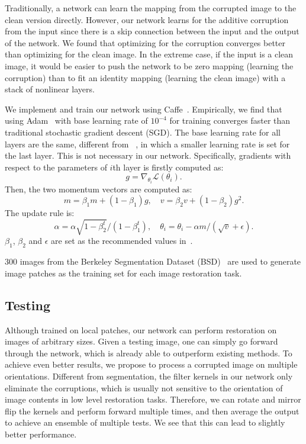 Traditionally, a  network can learn the mapping from the corrupted image to the clean version
directly. However, our network learns for the additive corruption from the input since there
is a skip connection between the input and the output of the network.
%
%
%
We found that optimizing for the corruption converges better than
optimizing for the clean image. In the extreme case, if the input is a clean image, it would be easier
to push the network to be zero mapping (learning the corruption) than to fit an identity
mapping (learning the clean image) with a stack of nonlinear layers.

We implement and train our network using Caffe~\cite{jia2014caffe}. Empirically, we find
that using Adam~\cite{DBLP:journals/corr/KingmaB14} with base learning rate of $10^{-4}$ for
training converges faster than traditional stochastic gradient descent (SGD). The base
learning rate for all layers are the same, different from ~\cite{DBLP:journals/pami/DongLHT16,
DBLP:conf/nips/JainS08}, in which a smaller learning rate is set for the last layer.
This  is not necessary in our network. Specifically, gradients with respect to the
parameters of $i$th layer is firstly computed as:
\begin{equation}
g = \nabla_{\theta_i}\mathcal{L}(\theta_i).
\end{equation}
Then, the two momentum vectors are computed as:
\begin{equation}
m = \beta_1m + (1 - \beta_1)g,\quad v = \beta_2v + (1-\beta_2)g^2.
\end{equation}
The update rule is:
\begin{equation}
\alpha = \alpha\sqrt{1-\beta_2^t}/(1-\beta_1^t), \quad \theta_i=\theta_i-\alpha m/(\sqrt{v}+\epsilon).
\end{equation}
$\beta_1$, $\beta_2$ and $\epsilon$ are set as the recommended values in~\cite{DBLP:journals/corr/KingmaB14}.

300 images from the Berkeley Segmentation Dataset (BSD)~\cite{MartinFTM01} are used to
generate image patches as the training set for each image restoration task.
%
%
%




\subsection{Testing}

Although trained on local patches, our network can perform restoration on images of arbitrary sizes.
Given a testing image, one can simply go forward through the network, which is already able to
 outperform existing methods. To achieve even better results, we propose
to process a corrupted image on multiple orientations. Different from segmentation, the
filter kernels in our network only eliminate the corruptions, which is usually not sensitive
to the orientation of image contents in low level restoration tasks. Therefore, we can rotate
and mirror flip the kernels and perform forward multiple times, and then average the output to
achieve an ensemble of multiple tests. We see that this can lead to slightly better performance.
